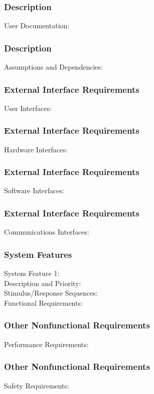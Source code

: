 \documentclass[utf8x]{beamer}
\begin{document}
\begin{frame}[t]
\frametitle{\huge Description} %
\Large User Documentation:
\end{frame}

\begin{frame}[t]
\frametitle{\huge Description} %
\Large Assumptions and Dependencies:
\end{frame}
\begin{frame}[t]
\frametitle{\LARGE External Interface Requirements} %
\Large User Interfaces:
\end{frame}

\begin{frame}[t]
\frametitle{\LARGE External Interface Requirements} %
\Large Hardware Interfaces:
\end{frame}

\begin{frame}[t]
\frametitle{\LARGE External Interface Requirements} %
\Large Software Interfaces:
\end{frame}

\begin{frame}[t]
\frametitle{\LARGE External Interface Requirements} %
\Large Communications Interfaces:
\end{frame}
\begin{frame}[t]
\frametitle{\huge System Features} %
\Large System Feature 1:
\\ \hspace{1em}\large Description and Priority:
\\ \hspace{1em} Stimulus/Response Sequences:
\\ \hspace{1em} Functional Requirements:
\end{frame}
\begin{frame}[t]
\frametitle{\LARGE Other Nonfunctional Requirements} %
\Large Performance Requirements:
\end{frame}

\begin{frame}[t]
\frametitle{\LARGE Other Nonfunctional Requirements} %
\Large Safety Requirements:
\end{frame}
\end{document}
